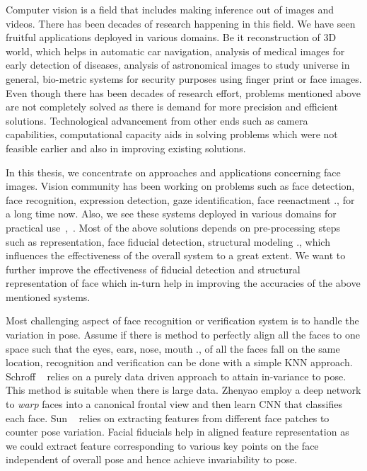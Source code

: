 Computer vision is a field that includes making inference out of images and videos. There has been decades of research 
happening in this field. We have seen fruitful applications deployed in various domains. Be it 
reconstruction of 3D world, which helps in automatic car navigation, analysis of medical images for 
early detection of diseases, analysis of astronomical images to study universe in general, bio-metric
systems for security purposes using finger print or face images. Even though there has been decades of 
research effort, problems mentioned above are not completely solved as there is demand for more precision
and efficient solutions. Technological advancement from other ends such as camera capabilities,
computational capacity aids in solving problems which were not feasible earlier and also in improving 
existing solutions.

In this thesis, we concentrate on approaches and applications concerning face images. Vision community 
has been working on problems such as face detection, face recognition, expression detection, gaze
identification, face reenactment \etc., for a long time now. Also, we see these systems deployed in various 
domains for practical use~\cite{kairos},~\cite{ms_emotion}. Most of the above solutions depends on pre-processing steps such as representation, face fiducial 
detection, structural modeling \etc., which influences the effectiveness of the overall system to a great extent. 
We want to further improve the effectiveness of fiducial detection and structural representation of face 
which in-turn help in improving the accuracies of the above mentioned systems.

Most challenging aspect of face recognition or verification system is to handle the variation in 
pose. Assume if there is method to perfectly align all the faces to one space such that the eyes,
ears, nose, mouth \etc., of all the faces fall on the same location, recognition and verification
can be done with a simple KNN approach. Schroff \etal ~\cite{conf/cvpr/SchroffKP15} relies on a purely data driven 
approach to attain in-variance to pose. This method is suitable when there is large data. 
Zhenyao \etal \cite{DBLP:journals/corr/ZhuLWT14} employ a deep network to \textit{warp} faces into a canonical 
frontal view and then learn CNN that classifies each face. Sun \etal~\cite{NIPS2014_5416} relies on 
extracting features from different face patches to counter pose variation. Facial fiducials help in
aligned feature representation as we could extract feature corresponding to various key points on 
the face independent of overall pose and hence achieve invariability to pose. 

